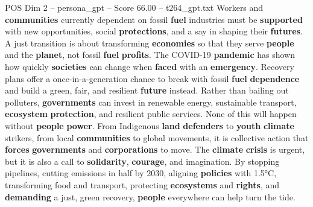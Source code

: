 \begin{textsample}{POS Dim 2 – persona\_gpt – Score 66.00 – t264\_gpt.txt}
Workers and \textbf{communities} currently dependent on fossil \textbf{fuel} industries must be \textbf{supported} with new opportunities, social \textbf{protections}, and a say in shaping their \textbf{futures}.
A just transition is about transforming \textbf{economies} so that they serve \textbf{people} and the \textbf{planet}, not fossil \textbf{fuel} \textbf{profits}.
The COVID-19 \textbf{pandemic} has shown how quickly \textbf{societies} can change when \textbf{faced} with an \textbf{emergency}.
Recovery plans offer a once-in-a-generation chance to break with fossil \textbf{fuel} \textbf{dependence} and build a green, fair, and resilient \textbf{future} instead.
Rather than bailing out polluters, \textbf{governments} can invest in renewable energy, sustainable transport, \textbf{ecosystem} \textbf{protection}, and resilient public services.
None of this will happen without \textbf{people} \textbf{power}.
From Indigenous \textbf{land} \textbf{defenders} to \textbf{youth} \textbf{climate} strikers, from local \textbf{communities} to global movements, it is collective action that \textbf{forces} \textbf{governments} and \textbf{corporations} to move.
The \textbf{climate} \textbf{crisis} is urgent, but it is also a call to \textbf{solidarity}, \textbf{courage}, and imagination.
By stopping pipelines, cutting emissions in half by 2030, aligning \textbf{policies} with 1.5°C, transforming food and transport, protecting \textbf{ecosystems} and \textbf{rights}, and \textbf{demanding} a just, green recovery, \textbf{people} everywhere can help turn the tide.

\end{textsample}
